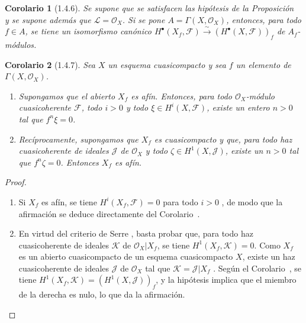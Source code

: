 \documentclass[10pt,oneside,openany]{book}
\theoremstyle{egaenv}\newtheorem*{env}{---}
\theoremstyle{egastatement}
\newtheorem*{corollary}{Corolario}
\theoremstyle{egadescription}
\begin{document}
\begin{corollary}[1.4.6]
\label{III.1.4.6}
\label{III.1.4.6-fr}
Se supone que se satisfacen las hipótesis de la Proposición~\textup{} y se supone además que $\mathcal L=\mathcal O_X$.
Si se pone $A=\Gamma(X,\mathcal O_X)$, entonces, para todo $f\in A$, se tiene un isomorfismo canónico $H^\bullet(X_f,\mathcal F)
\xrightarrow{\sim}(H^\bullet(X,\mathcal F))_f$ de $A_f$-módulos.
\end{corollary}

\begin{corollary}[1.4.7]
\label{III.1.4.7}
\label{III.1.4.7-fr}
Sea $X$ un esquema cuasicompacto y sea $f$ un elemento de $\Gamma(X,\mathcal O_X)$.
\begin{enumerate}
  \item[{\rm(i)}] Supongamos que el abierto $X_f$ es afín.
    Entonces, para todo $\mathcal O_X$-módulo cuasicoherente $\mathcal F$, todo $i>0$ y todo $\xi\in H^i(X,\mathcal F)$, existe un entero $n>0$ tal que $f^n\xi=0$.
  \item[{\rm(ii)}] Recíprocamente, supongamos que $X_f$ es cuasicompacto y que, para todo haz cuasicoherente de ideales $\mathcal J$ de $\mathcal O_X$ y todo $\zeta\in H^1(X,\mathcal J)$, existe un $n>0$ tal que $f^n\zeta=0$.
    Entonces $X_f$ es afín.
\end{enumerate}
\end{corollary}

\begin{proof}
\medskip\noindent
\begin{enumerate}
  \item[(i)] Si $X_f$ es afín, se tiene $H^i(X_f,\mathcal F)=0$ para todo $i>0$ , de modo que la afirmación se deduce directamente del Corolario~.
  \item[(ii)] En virtud del criterio de Serre , basta probar que, para todo haz cuasicoherente de ideales $\mathcal K$ de $\mathcal O_X\vert X_f$, se tiene $H^1(X_f,\mathcal K)=0$.
    Como $X_f$ es un abierto cuasicompacto de un esquema cuasicompacto $X$, existe un haz cuasicoherente de ideales $\mathcal J$ de $\mathcal O_X$ tal que $\mathcal K=\mathcal J\vert X_f$ .
    Según el Corolario~, se tiene $H^1(X_f,\mathcal K)=(H^1(X,\mathcal J))_f$, y la hipótesis implica que el miembro de la derecha es nulo, lo que da la afirmación.
\end{enumerate}
\end{proof}
\end{document}
